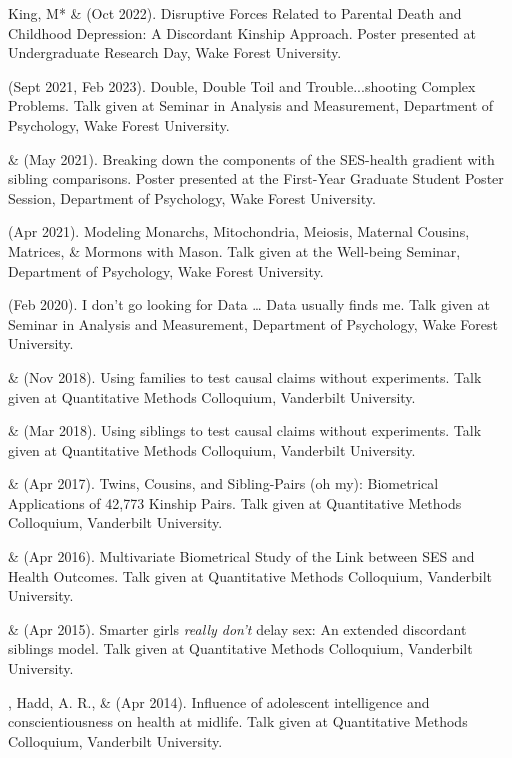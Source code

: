 \begin{etaremune}

\item King, M* \& \meb (Oct 2022). Disruptive Forces Related to Parental Death and Childhood Depression: A Discordant Kinship Approach. Poster presented at Undergraduate Research Day, Wake Forest University.

\item \meb (Sept 2021, Feb 2023). Double, Double Toil and Trouble...shooting Complex Problems. Talk given at Seminar in Analysis and Measurement, Department of Psychology, Wake Forest University. 
%
\item \yrh \& \meb (May 2021). Breaking down the components of the SES-health gradient with sibling comparisons. Poster presented at the First-Year Graduate Student Poster Session, Department of Psychology, Wake Forest University.
%
\item\meb (Apr 2021). Modeling Monarchs, Mitochondria, Meiosis, Maternal Cousins, Matrices, \& Mormons with Mason. Talk given at the Well-being Seminar, Department of Psychology, Wake Forest University. 
%
\item\meb (Feb 2020). I don't go looking for Data … Data usually finds me. Talk given at Seminar in Analysis and Measurement, Department of Psychology, Wake Forest University. 
%
\item\meb \& \Joe (Nov 2018). Using families to test causal claims without experiments. Talk given at Quantitative Methods Colloquium, Vanderbilt University. 
%
\item\meb \& \Joe (Mar 2018). Using siblings to test causal claims without experiments. Talk given at Quantitative Methods Colloquium, Vanderbilt University.
%
\item\meb \& \Joe (Apr 2017). Twins, Cousins, and Sibling-Pairs (oh my): Biometrical Applications of 42,773 Kinship Pairs. Talk given at Quantitative Methods Colloquium, Vanderbilt University. %
%
\item\meb \& \Joe (Apr 2016). Multivariate Biometrical Study of the Link between SES and Health Outcomes. Talk given at Quantitative Methods Colloquium, Vanderbilt University.
%
\item\meb \& \Joe (Apr 2015). Smarter girls \textit{really don't} delay sex: An extended discordant siblings model. Talk given at Quantitative Methods Colloquium, Vanderbilt University.
\item\meb, Hadd, A. R., \& \Joe (Apr 2014). Influence of adolescent intelligence and conscientiousness on health at midlife. Talk given at Quantitative Methods Colloquium, Vanderbilt University. 

\end{etaremune}
